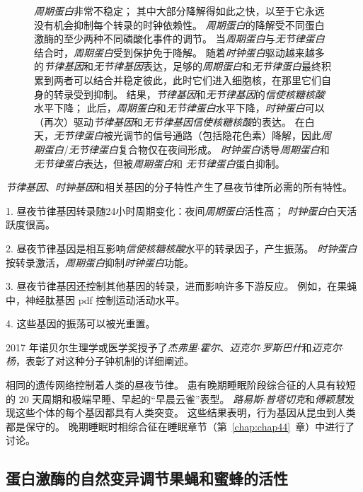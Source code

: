\begin{figure}[htbp]
{		\textit{周期蛋白}非常不稳定；
		其中大部分降解得如此之快，以至于它永远没有机会抑制每个转录的时钟依赖性。 
		\textit{周期蛋白}的降解受不同蛋白激酶的至少两种不同磷酸化事件的调节。
		当\textit{周期蛋白}与\textit{无节律蛋白}结合时，\textit{周期蛋白}受到保护免于降解。 
		随着\textit{时钟蛋白}驱动越来越多的\textit{节律基因}和\textit{无节律基因}表达，足够的\textit{周期蛋白}和\textit{无节律蛋白}最终积累到两者可以结合并稳定彼此，此时它们进入细胞核，在那里它们自身的转录受到抑制。
		结果，\textit{节律基因}和\textit{无节律基因}的\textit{信使核糖核酸}水平下降； 此后，\textit{周期蛋白}和\textit{无节律蛋白}水平下降，\textit{时钟蛋白}可以（再次）驱动\textit{节律基因}和\textit{无节律基因}\textit{信使核糖核酸}的表达。
		在白天，\textit{无节律蛋白}被光调节的信号通路（包括隐花色素）降解，因此\textit{周期蛋白}/\textit{无节律蛋白}复合物仅在夜间形成。
		\textit{时钟蛋白}诱导\textit{周期蛋白}和\textit{无节律蛋白}表达，但被\textit{周期蛋白}和 \textit{无节律蛋白}蛋白抑制。}
	\label{fig:2_13}
\end{figure}


\textit{节律基因}、\textit{时钟基因}和相关基因的分子特性产生了昼夜节律所必需的所有特性。

1. 昼夜节律基因转录随24小时周期变化：夜间\textit{周期蛋白}活性高；
\textit{时钟蛋白}白天活跃度很高。


2. 昼夜节律基因是相互影响\textit{信使核糖核酸}水平的转录因子，产生振荡。
\textit{时钟蛋白}按转录激活，\textit{周期蛋白}抑制\textit{时钟蛋白}功能。


3. 昼夜节律基因还控制其他基因的转录，进而影响许多下游反应。
例如，在果蝇中，神经肽基因 pdf 控制运动活动水平。


4. 这些基因的振荡可以被光重置。


2017 年诺贝尔生理学或医学奖授予了\textit{杰弗里$\cdot$霍尔}、\textit{迈克尔$\cdot$罗斯巴什}和\textit{迈克尔$\cdot$杨}，表彰了对这种分子钟机制的详细阐述。


相同的遗传网络控制着人类的昼夜节律。
患有晚期睡眠阶段综合征的人具有较短的 20 天周期和极端早睡、早起的“早晨云雀”表型。
\textit{路易斯$\cdot$普塔切克}和\textit{傅颖慧}发现这些个体的每个基因都具有人类突变。
这些结果表明，行为基因从昆虫到人类都是保守的。 
晚期睡眠时相综合征在睡眠章节（第~\ref{chap:chap44}~章）中进行了讨论。



\subsection{蛋白激酶的自然变异调节果蝇和蜜蜂的活性}

